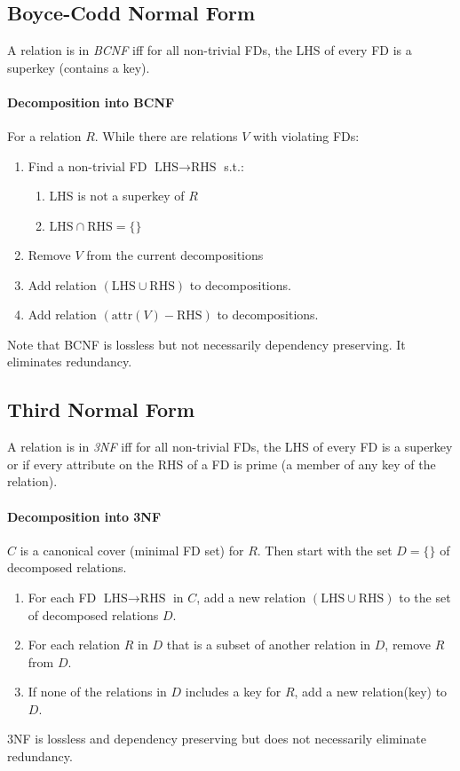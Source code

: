 \documentclass[twocolumn,english]{article}
\begin{document}
\subsection{Boyce-Codd Normal Form}

A relation is in \emph{BCNF} iff for all non-trivial FDs, the LHS
of every FD is a superkey (contains a key).


\paragraph{Decomposition into BCNF}

For a relation $R$. While there are relations $V$ with violating
FDs:
\begin{enumerate}
\item Find a non-trivial FD $\mbox{LHS}\rightarrow\mbox{RHS}$ s.t.:

\begin{enumerate}
\item LHS is not a superkey of $R$
\item $\mbox{LHS}\cap\mbox{RHS}=\{\}$
\end{enumerate}
\item Remove $V$ from the current decompositions
\item Add relation $\left(\mbox{LHS}\cup\mbox{RHS}\right)$ to decompositions.
\item Add relation $\left(\mbox{attr}\left(V\right)-\mbox{RHS}\right)$
to decompositions.
\end{enumerate}
Note that BCNF is lossless but not necessarily dependency preserving.
It eliminates redundancy.


\subsection{Third Normal Form}

A relation is in \emph{3NF} iff for all non-trivial FDs, the LHS of
every FD is a superkey or if every attribute on the RHS of a FD is
prime (a member of any key of the relation).


\paragraph{Decomposition into 3NF}

$C$ is a canonical cover (minimal FD set) for $R$. Then start with
the set $D=\{\}$ of decomposed relations.
\begin{enumerate}
\item For each FD $\mbox{LHS}\rightarrow\mbox{RHS}$ in $C$, add a new
relation $\left(\mbox{LHS}\cup\mbox{RHS}\right)$ to the set of decomposed
relations $D$.
\item For each relation $R$ in $D$ that is a subset of another relation
in $D$, remove $R$ from $D$.
\item If none of the relations in $D$ includes a key for $R$, add a new
relation(key) to $D$.
\end{enumerate}
3NF is lossless and dependency preserving but does not necessarily
eliminate redundancy.
\end{document}
